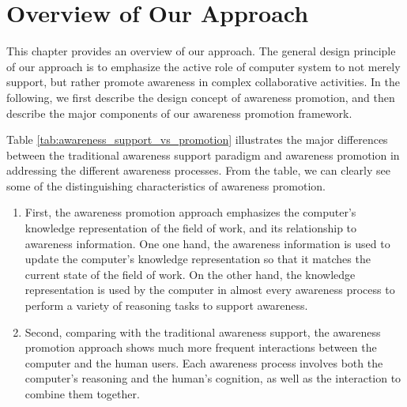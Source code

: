 

\chapter{Overview of Our Approach} %
\label{cha:our_approach_overview}


This chapter provides an overview of our approach. The general design principle of our approach is to emphasize the active role of computer system to not merely support, but rather promote awareness in complex collaborative activities. In the following, we first describe the design concept of awareness promotion, and then describe the major components of our awareness promotion framework.



Table \ref{tab:awareness_support_vs_promotion} illustrates the major differences between the traditional awareness support paradigm and awareness promotion in addressing the different awareness processes. From the table, we can clearly see some of the distinguishing characteristics of awareness promotion. 

\begin{enumerate}
   \item First, the awareness promotion approach emphasizes the computer's knowledge representation of the field of work, and its relationship to awareness information. One one hand, the awareness information is used to update the computer's knowledge representation so that it matches the current state of the field of work. On the other hand, the knowledge representation is used by the computer in almost every awareness process to perform a variety of reasoning tasks to support awareness.
   \item Second, comparing with the traditional awareness support, the awareness promotion approach shows much more frequent interactions between the computer and the human users. Each awareness process involves both the computer's reasoning and the human's cognition, as well as the interaction to combine them together. 
\end{enumerate} 

